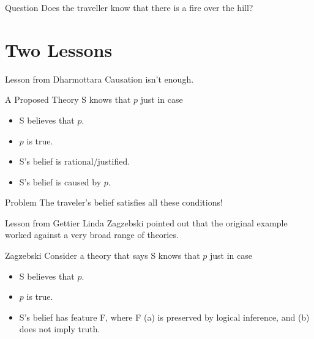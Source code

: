 \documentclass[
  17pt,
  letterpaper,
  ignorenonframetext,
  aspectratio=169,
]{beamer}
\providecommand{\tightlist}{%
  \setlength{\itemsep}{0pt}\setlength{\parskip}{0pt}}\usepackage{longtable,booktabs,array}
\begin{document}
\begin{frame}{Question}
\protect\hypertarget{question-1}{}
Does the traveller know that there is a fire over the hill?
\end{frame}

\hypertarget{two-lessons}{%
\section{Two Lessons}\label{two-lessons}}

\begin{frame}{Lesson from Dharmottara}
\protect\hypertarget{lesson-from-dharmottara}{}
Causation isn't enough.
\end{frame}

\begin{frame}{A Proposed Theory}
\protect\hypertarget{a-proposed-theory}{}
S knows that \(p\) just in case

\begin{itemize}[<+->]
\tightlist
\item
  S believes that \(p\).
\item
  \(p\) is true.
\item
  S's belief is rational/justified.
\item
  S's belief is caused by \(p\).
\end{itemize}
\end{frame}

\begin{frame}{Problem}
\protect\hypertarget{problem}{}
The traveler's belief satisfies all these conditions!
\end{frame}

\begin{frame}{Lesson from Gettier}
\protect\hypertarget{lesson-from-gettier}{}
Linda Zagzebski pointed out that the original example worked against a
very broad range of theories.
\end{frame}

\begin{frame}{Zagzebski}
\protect\hypertarget{zagzebski}{}
Consider a theory that says S knows that \(p\) just in case

\begin{itemize}[<+->]
\tightlist
\item
  S believes that \(p\).
\item
  \(p\) is true.
\item
  S's belief has feature F, where F (a) is preserved by logical
  inference, and (b) does not imply truth.
\end{itemize}
\end{frame}
\end{document}
